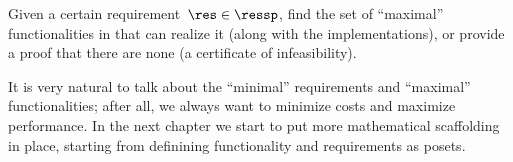 \begin{problem}[FixReqMinFun]
    \label{prob:FixReqMinFun-informal}
    Given a certain requirement~$\res\in\ressp$, find the set of ``maximal'' functionalities in that can realize it (along with the implementations), or provide a proof that there are none (a certificate of infeasibility).
\end{problem}

It is very natural to talk about the ``minimal'' requirements and ``maximal'' functionalities; after all, we always want to minimize costs and maximize performance.
In the next chapter we start to put more mathematical scaffolding in place, starting from definining functionality and requirements as posets.


